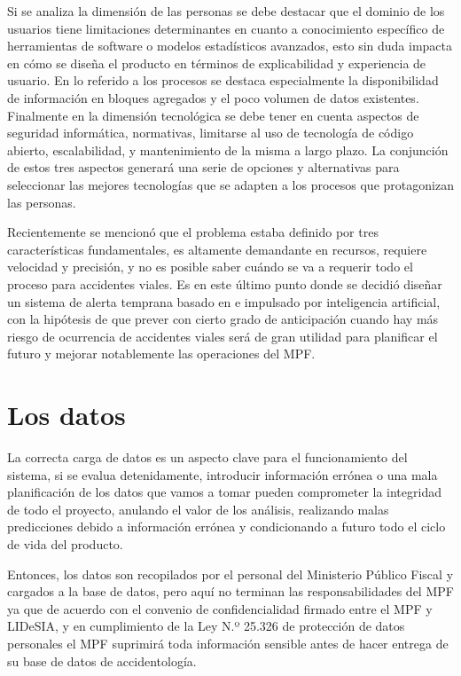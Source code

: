 Si se analiza la dimensión de las personas se debe destacar que el dominio de los usuarios tiene limitaciones determinantes en cuanto a conocimiento específico de herramientas de software o modelos estadísticos avanzados, esto sin duda impacta en cómo se diseña el producto en términos de explicabilidad y experiencia de usuario. En lo referido a los procesos se destaca especialmente la disponibilidad de información en bloques agregados y el poco volumen de datos existentes. Finalmente en la dimensión tecnológica se debe tener en cuenta aspectos de seguridad informática, normativas, limitarse al uso de tecnología de código abierto, escalabilidad, y mantenimiento de la misma a largo plazo. La conjunción de estos tres aspectos generará una serie de opciones y alternativas para seleccionar las mejores tecnologías que se adapten a los procesos que protagonizan las personas.

Recientemente se mencionó que el problema estaba definido por tres características fundamentales, es altamente demandante en recursos, requiere velocidad y precisión, y no es posible saber cuándo se va a requerir todo el proceso para accidentes viales. Es en este último punto donde se decidió diseñar un sistema de alerta temprana basado en  e impulsado por inteligencia artificial, con la hipótesis de que prever con cierto grado de anticipación cuando hay más riesgo de ocurrencia de accidentes viales será de gran utilidad para planificar el futuro y mejorar notablemente las operaciones del MPF.

\section{Los datos}\label{los-datos}

La correcta carga de datos es un aspecto clave para el funcionamiento del sistema, si se evalua detenidamente, introducir información errónea o una mala planificación de los datos que vamos a tomar pueden comprometer la integridad de todo el proyecto, anulando el valor de los análisis, realizando malas predicciones debido a información errónea y condicionando a futuro todo el ciclo de vida del producto.

Entonces, los datos son recopilados por el personal del Ministerio Público Fiscal y cargados a la base de datos, pero aquí no terminan las responsabilidades del MPF ya que de acuerdo con el convenio de confidencialidad firmado entre el MPF y LIDeSIA, y en cumplimiento de la Ley N.º 25.326 de protección de datos personales el MPF suprimirá toda información sensible antes de hacer entrega de su base de datos de accidentología.

